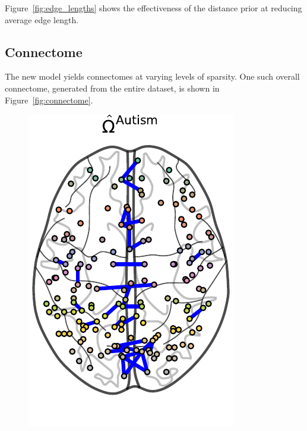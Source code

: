 \documentclass{article}
\begin{document}
 Figure~\ref{fig:edge_lengths} shows the effectiveness of the distance prior at reducing average edge length. 
 
\subsection{Connectome}
The new model yields connectomes at varying levels of sparsity. One such overall connectome, generated from the entire dataset, is shown in Figure~\ref{fig:connectome}.

\begin{figure}[H]
	\centering
	\includegraphics[width=\columnwidth]{../../plots/connectomes/autism.pdf}

\end{figure}
\end{document}
